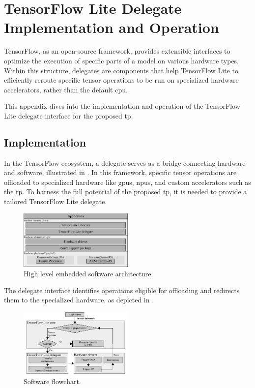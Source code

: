 \section{TensorFlow Lite Delegate Implementation and Operation}
\label{chap:appendix_delegate}
TensorFlow, as an open-source framework, provides extensible interfaces to optimize the execution of specific parts of a model on various hardware types. Within this structure, delegates are components that help TensorFlow Lite to efficiently reroute specific tensor operations to be run on specialized hardware accelerators, rather than the default \gls{cpu}.

This appendix dives into the implementation and operation of the TensorFlow Lite delegate interface for the proposed \gls{tp}.

\subsection{Implementation}

In the TensorFlow ecosystem, a delegate serves as a bridge connecting hardware and software, illustrated in . In this framework, specific tensor operations are offloaded to specialized hardware like \glspl{gpu}, \glspl{npu}, and custom accelerators such as the \gls{tp}. To harness the full potential of the proposed \gls{tp}, it is needed to provide a tailored TensorFlow Lite delegate.

\begin{figure}[h!]
	\centering
	\includegraphics[width=0.5\textwidth]{./chapters/cnn_accelerator/figures/sw_stack.pdf}
	\caption{High level embedded software architecture.}
	\label{fig:sw_stack_appendix}
\end{figure}

The delegate interface identifies operations eligible for offloading and redirects them to the specialized hardware, as depicted in .

\begin{figure}[h!]
	\centering
	\includegraphics[width=0.5\textwidth]{./chapters/cnn_accelerator/figures/sw_stack_flowchart.pdf}
	\caption{Software flowchart.}
	\label{fig:sw_stack_flowchart_apendix}
\end{figure}

